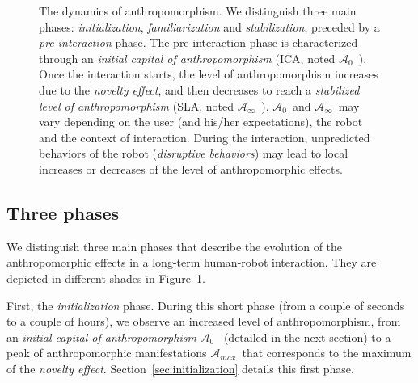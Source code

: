 \documentclass{frontiersSCNS} %
\newcommand{\ICA}{{$\mathcal{A}_0$~}}
\newcommand{\SLA}{{$\mathcal{A}_\infty$~}}
\newcommand{\AntMax}{{$\mathcal{A}_{max}$~}}
\begin{document}
\begin{figure}[htb]

\caption{The dynamics of anthropomorphism. We distinguish three main phases:
    \emph{initialization}, \emph{familiarization} and \emph{stabilization},
    preceded by a \emph{pre-interaction} phase. The pre-interaction phase
    is characterized through an \emph{initial capital of anthropomorphism} (ICA, noted \ICA).
    Once the interaction starts, the level of anthropomorphism increases due to
    the \emph{novelty effect}, and then decreases to reach a \emph{stabilized
    level of anthropomorphism} (SLA, noted \SLA). \ICA and \SLA may vary
    depending on the user (and his/her expectations), the robot and the context
    of interaction.  During the interaction, unpredicted behaviors of the robot
    (\emph{disruptive behaviors}) may lead to local increases or decreases of
    the level of anthropomorphic effects.}

\label{fig:dynamics}
\end{figure}

\subsection{Three phases}
\label{sec:phases}

We distinguish three main phases that describe the evolution of the
anthropomorphic effects in a long-term human-robot interaction. They are
depicted in different shades in Figure~\ref{fig:dynamics}.

First, the \emph{initialization} phase. During this short phase (from a couple
of seconds to a couple of hours), we observe an increased level of
anthropomorphism, from an \emph{initial capital of anthropomorphism} \ICA
(detailed in the next section) to a peak of anthropomorphic manifestations
\AntMax that corresponds to the maximum of the \emph{novelty effect}.
Section~\ref{sec:initialization} details this first phase.
\end{document}
